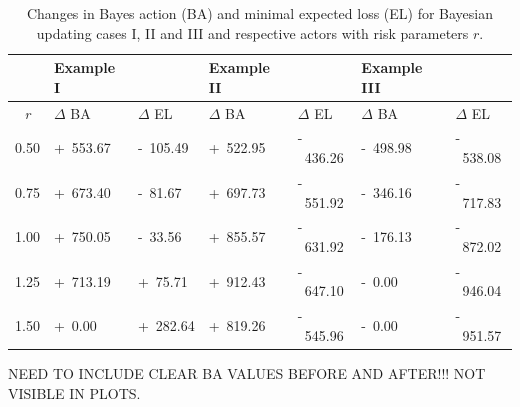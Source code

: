 				\begin{table}
					\centering
					\begin{tabular}[c]{| c || l | l || l | l || l | l |}
						\hline
						& Example I & & Example II & & Example III & \\
						\hline
						\hline
						\textit{r} & $\Delta$ BA & $\Delta$ EL & $\Delta$ BA & $\Delta$ EL & $\Delta$ BA & $\Delta$ EL\\ 
						\hline
						0.50 & +~553.67 & -~105.49 & +~522.95 & -~436.26 & -~498.98 & -~538.08 \\ 
						0.75 & +~673.40 & -~81.67 & +~697.73 & -~551.92 & -~346.16 & -~717.83  \\ 
						1.00 & +~750.05 & -~33.56 & +~855.57 & -~631.92 & -~176.13 & -~872.02 \\ 
						1.25 & +~713.19 & +~75.71 & +~912.43 & -~647.10 & -~0.00 & -~946.04 \\ 
						1.50 & +~0.00 & +~282.64 & +~819.26 & -~545.96 & -~0.00 & -~951.57  \\ 
						\hline
					\end{tabular}
					\caption{Changes in Bayes action (BA) and minimal expected loss (EL) for Bayesian updating cases I, II and III and respective actors with risk parameters $r$.}
					\label{tab:update_examples_all}
				\end{table}
				
				NEED TO INCLUDE CLEAR BA VALUES BEFORE AND AFTER!!! NOT VISIBLE IN PLOTS.
				
